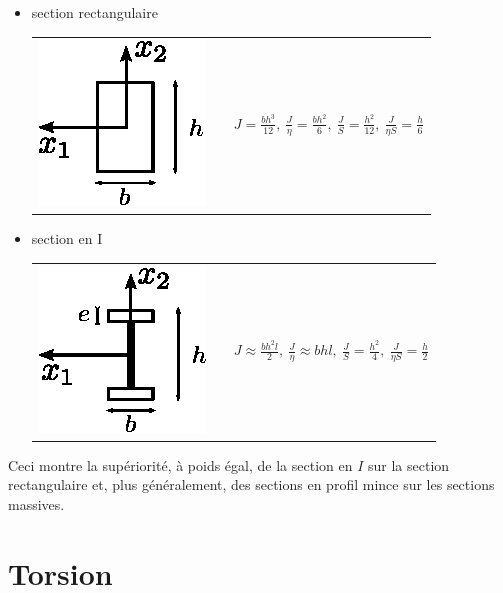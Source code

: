 \begin{itemize}
\item section rectangulaire\\[5pt]
\begin{tabular}{m{2cm}p{1cm}m{7cm}}
        \includegraphics{../images/T1_Ch07-07}&&
        $\displaystyle J = \frac{bh^3}{12},\ \frac{J}{\eta} = \frac{bh^2}{6},\ \frac{J}{S} = \frac{h^2}{12},\ \frac{J}{\eta S} = \frac{h}{6}$
\end{tabular}
\item section en I
\\[5pt]
\begin{tabular}{m{2cm}p{1cm}m{7cm}}
        \includegraphics{../images/T1_Ch07-08}&&
        $\displaystyle J \approx \frac{bh^2l}{2},\ \frac{J}{\eta} \approx bhl,\ \frac{J}{S} = \frac{h^2}{4},\ \frac{J}{\eta S} = \frac{h}{2}$
\end{tabular}
\end{itemize}
Ceci montre la supériorité, à poids égal, de la section en $I$ sur la section rectangulaire et, plus généralement, des sections en profil mince sur les sections massives.

\section{Torsion} \label{sec:Ch07-2}
